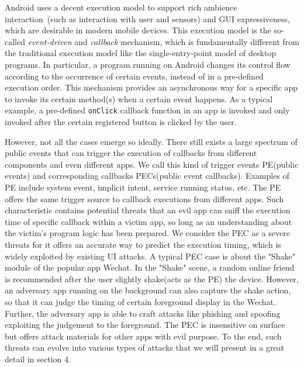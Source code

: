 Android uses a decent execution model to support rich ambience interaction~(such as interaction with user and sensors) and GUI expressiveness, 
which are desirable in modern mobile devices. 
This execution model is the so-called \emph{event-driven} and \emph{callback} mechanism, 
which is fundamentally different from the traditional execution model like the single-entry-point model of desktop programs. 
In particular, a program running on Android changes its control flow according to the occurrence of certain events, instead of in a pre-defined execution order. 
This mechanism provides an asynchronous way for a specific app to invoke its certain method(s) when a certain event happens. 
As a typical example, a pre-defined \texttt{onClick} callback function in an app is invoked and only invoked after the certain registered button is clicked by the user. 


However, not all the cases emerge so ideally. There still exists a large spectrum of public events that can trigger the execution of callbacks from different components and even different apps. We call this kind of trigger events PE(public events) and corresponding callbacks PECs(public event callbacks). Examples of PE include system event, implicit intent, service running status, etc. The PE offers the same trigger source to callback executions from different apps. Such characteristic contains potential threats that an evil app can sniff the execution time of specific callback within a victim app, so long as an understanding about the victim's program logic has been prepared. We consider the PEC as a severe threats for it offers an accurate way to predict the execution timing, which is widely exploited by existing UI attacks\cite{chen2014peeking}\cite{bianchi2015app}\cite{ren2015towards}. A typical PEC case is about the "Shake" module of the popular app Wechat. In the "Shake" scene, a random online friend is recommended after the user slightly shake(acts as the PE) the device. However, an adversary app running on the background can also capture the shake action, so that it can judge the timing of certain foreground display in the Wechat. Further, the adversary app is able to craft attacks like phishing and spoofing exploiting the judgement to the foreground. The PEC is insensitive on surface but offers attack materials for other apps with evil purpose. To the end, such threats can evolve into various types of attacks that we will present in a great detail in section 4.









